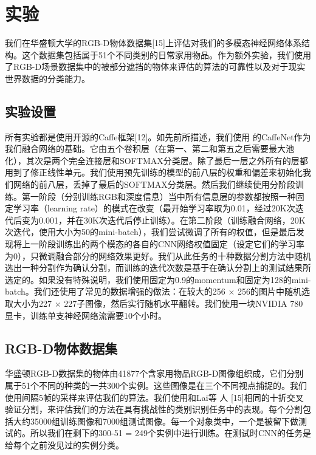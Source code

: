 \section{实验}

我们在华盛顿大学的RGB-D物体数据集[15]上评估对我们的多模态神经网络体系结构。这个数据集包括属于51个不同类别的日常家用物品。作为额外实验，我们使用了RGB-D场景数据集中的被部分遮挡的物体来评估的算法的可靠性以及对于现实世界数据的分类能力。

\subsection{实验设置}

所有实验都是使用开源的Caffe框架[12]。如先前所描述，我们使用
的CaffeNet作为我们融合网络的基础。它由五个卷积层（在第一、第二和第五之后需要最大池化），其次是两个完全连接层和SOFTMAX分类层。除了最后一层之外所有的层都用到了修正线性单元。我们使用预先训练的模型的前八层的权重和偏差来初始化我们网络的前八层，丢掉了最后的SOFTMAX分类层。然后我们继续使用分阶段训练。第一阶段（分别训练RGB和深度信息）当中所有信息层的参数都按照一种固定学习率（learning rate）的模式在改变（最开始学习率取为0.01，经过20K次迭代后变为0.001，并在30K次迭代后停止训练）。在第二阶段（训练融合网络，20K次迭代，使用大小为50的mini-batch），我们尝试微调了所有的权值，但是最后发现将上一阶段训练出的两个模态的各自的CNN网络权值固定（设定它们的学习率为0），只微调融合部分的网络效果更好。我们从此任务的十种数据分割方法中随机选出一种分割作为确认分割，而训练的迭代次数是基于在确认分割上的测试结果所选定的。如果没有特殊说明，我们使用固定为0.9的momentum和固定为128的mini-batch。我们还使用了常见的数据增强的做法：在较大的256 $\times$ 256的图片中随机选取大小为227 $\times$ 227子图像，然后实行随机水平翻转。我们使用一块NVIDIA 780显卡，训练单支神经网络流需要10个小时。

\subsection{RGB-D物体数据集}

华盛顿RGB-D数据集的物体由41877个含家用物品RGB-D图像组织成，它们分别属于51个不同的种类的一共300个实例。这些图像是在三个不同视点捕捉的。我们使用间隔5帧的采样来评估我们的算法。我们使用和Lai等
人 [15]相同的十折交叉验证分割，来评估我们的方法在具有挑战性的类别识别任务中的表现。每个分割包括大约35000组训练图像和7000组测试图像。每一个对象类中，一个是被留下做测试的。所以我们在剩下的300-51 = 249个实例中进行训练。在测试时CNN的任务是给每个之前没见过的实例分类。

